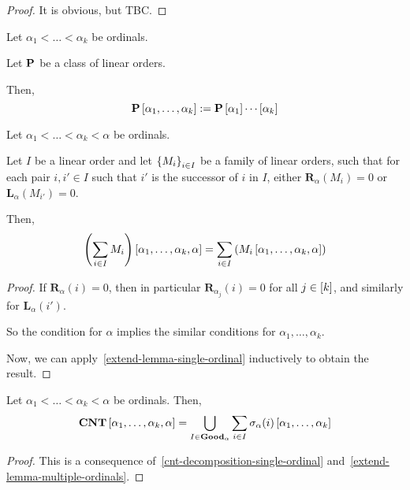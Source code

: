 \begin{proof}
  It is obvious, but TBC.
\end{proof}

\begin{notation}
  Let $\alpha_1 < \ldots < \alpha_k$ be ordinals.

  Let $\mathbf{P}$ be a class of linear orders.

  Then,
  \[
    \mathbf{P} \left[ {\alpha_1, \ldots, \alpha_k} \right] := \mathbf{P} \left[ {\alpha_1} \right] \cdots \left[ {\alpha_k} \right]
  \]
\end{notation}

\begin{corollary}\label{extend-lemma-multiple-ordinals}
  Let $\alpha_1 < \ldots < \alpha_k < \alpha$ be ordinals.

  Let $I$ be a linear order
  and let $\left\{ {M_i} \right\}_{i \in I}$ be a family of linear orders,
  such that for each pair $i, i' \in I$
  such that $i'$ is the successor of $i$ in $I$,
  either $\mathbf{R}_\alpha(M_{i}) = 0$ or $\mathbf{L}_\alpha(M_{i'}) = 0$.

  Then,
  \[
    \left( { \sum_{i \in I} M_i } \right) \left[ {\alpha_1, \ldots, \alpha_k, \alpha} \right]
    = \sum_{i \in I} \left( { M_i \left[ {\alpha_1, \ldots, \alpha_k, \alpha} \right] } \right)
  \]
\end{corollary}

\begin{proof}
  If $\mathbf{R}_\alpha(i) = 0$, then in particular
  $\mathbf{R}_{\alpha_j}(i) = 0$ for all $j \in \left[ {k} \right]$,
  and similarly for $\mathbf{L}_\alpha(i')$.

  So the condition for $\alpha$ implies
  the similar conditions for $\alpha_1, \ldots, \alpha_k$.

  Now, we can apply~\cref{extend-lemma-single-ordinal} inductively
  to obtain the result.
\end{proof}

\begin{lemma}\label{cnt-decomposition-multiple-ordinals}
  Let $\alpha_1 < \ldots < \alpha_k < \alpha$ be ordinals. Then,
  \[
    \mathbf{CNT} \left[ {\alpha_1, \ldots, \alpha_k, \alpha} \right]
    = \bigcup_{I \in \mathbf{Good}_{\alpha}} \sum_{i \in I} \sigma_{\alpha}(i) \left[ {\alpha_1, \ldots, \alpha_k} \right]
  \]
\end{lemma}

\begin{proof}
  This is a consequence of~\cref{cnt-decomposition-single-ordinal}
  and~\cref{extend-lemma-multiple-ordinals}.
\end{proof}

